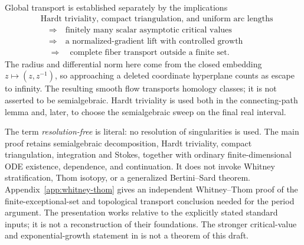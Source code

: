 \documentclass[11pt]{article}
\numberwithin{equation}{section}
\theoremstyle{definition}
\theoremstyle{remark}
\begin{document}
Global transport is established separately by the implications
\begin{align*}
 &\text{Hardt triviality, compact triangulation, and uniform arc lengths}\\
 &\quad\Longrightarrow\quad
       \text{finitely many scalar asymptotic critical values}\\
 &\quad\Longrightarrow\quad
       \text{a normalized-gradient lift with controlled growth}\\
 &\quad\Longrightarrow\quad
       \text{complete fiber transport outside a finite set}.
\end{align*}
The radius and differential norm here come from the closed embedding
$z\mapsto(z,z^{-1})$, so approaching a deleted coordinate hyperplane counts
as escape to infinity. The resulting smooth flow transports homology
classes; it is not asserted to be semialgebraic. Hardt triviality is used
both in the connecting-path lemma and, later, to choose the semialgebraic
sweep on the final real interval.

The term \emph{resolution-free} is literal: no resolution of singularities
is used. The main proof retains semialgebraic decomposition, Hardt
triviality, compact triangulation, integration and Stokes, together with
ordinary finite-dimensional ODE existence, dependence, and continuation.
It does not invoke Whitney stratification, Thom isotopy, or a generalized
Bertini--Sard theorem. Appendix~\ref{app:whitney-thom} gives an independent
Whitney--Thom proof of the finite-exceptional-set and topological
transport conclusion needed for the period argument. The presentation
works relative to the explicitly stated standard inputs; it is not a
reconstruction of their foundations. The stronger critical-value and
exponential-growth statement in \cite[Theorem 5]{DvK} is not a theorem
of this draft.
\end{document}
